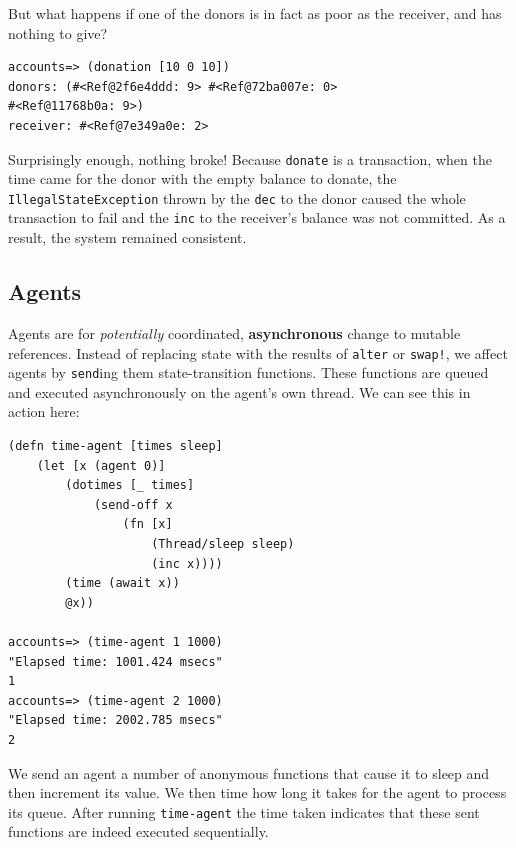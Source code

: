 \documentclass[a4paper,12pt]{kth-mag}
\begin{document}
But what happens if one of the donors is in fact as poor as the receiver, and has nothing to give?

\begin{listing}[H]
	\begin{verbatim}
accounts=> (donation [10 0 10])
donors: (#<Ref@2f6e4ddd: 9> #<Ref@72ba007e: 0> 
#<Ref@11768b0a: 9>)
receiver: #<Ref@7e349a0e: 2>
	\end{verbatim}
\end{listing}

Surprisingly enough, nothing broke! Because \texttt{donate} is a transaction, when the time came for the donor with the empty balance to donate, the \texttt{IllegalStateException} thrown by the \texttt{dec} to the donor caused the whole transaction to fail and the \texttt{inc} to the receiver's balance was not committed. As a result, the system remained consistent.

\subsection{Agents}

Agents are for \textit{potentially} coordinated, \textbf{asynchronous} change to mutable references. Instead of replacing state with the results of \texttt{alter} or \texttt{swap!}, we affect agents by \texttt{send}ing them state-transition functions. These functions are queued and executed asynchronously on the agent's own thread. We can see this in action here:

\begin{listing}[H]
	\begin{verbatim}
(defn time-agent [times sleep]
    (let [x (agent 0)]
        (dotimes [_ times]
            (send-off x
                (fn [x]
                    (Thread/sleep sleep)
                    (inc x))))
        (time (await x))
        @x))
        
accounts=> (time-agent 1 1000)
"Elapsed time: 1001.424 msecs"
1
accounts=> (time-agent 2 1000)
"Elapsed time: 2002.785 msecs"
2
	\end{verbatim}
\end{listing}

We send an agent a number of anonymous functions that cause it to sleep and then increment its value. We then time how long it takes for the agent to process its queue. After running \texttt{time-agent} the time taken indicates that these sent functions are indeed executed sequentially.
\end{document}
